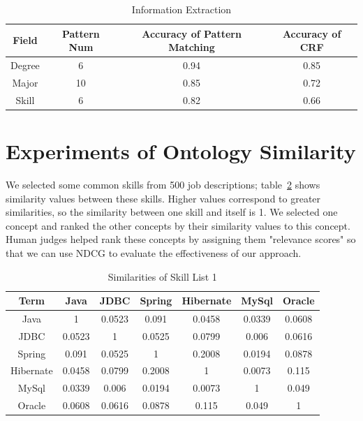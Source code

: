 \begin{table}[ht]
\caption{Information Extraction} %
\centering %
\begin{tabular}{   | c | c | c | c |   }
 \hline
          Field   & Pattern Num & Accuracy of Pattern Matching  & Accuracy of CRF   \\
 \hline
          Degree  & 6           & 0.94       &  0.85  \\
 \hline
          Major   & 10          & 0.85       &  0.72  \\
 \hline
          Skill   & 6           & 0.82       &  0.66  \\
 \hline
\end{tabular}
\label{tab:ieaccura} %
\end{table}

\section{Experiments of Ontology Similarity}

We selected some common skills from 500 job descriptions; table~\ref{tab:dismatrix3} shows similarity values between these skills. Higher values correspond to greater similarities, so the similarity between one skill and itself is 1. We selected one concept and ranked the other concepts by their similarity values to this concept. Human judges helped rank these concepts by assigning them "relevance scores" so that we can use NDCG to evaluate the effectiveness of our approach.

\begin{table}

\caption{Similarities of Skill List 1}
\begin{tabular}{ c | c c c c c c   }
 \hline
  Term       &  Java  &  JDBC  & Spring & Hibernate & MySql  & Oracle   \\  \hline
  Java   &   1    & 0.0523 & 0.091  &   0.0458  & 0.0339 & 0.0608    \\  \hline
    JDBC   & 0.0523 &   1    & 0.0525 &   0.0799  & 0.006  & 0.0616   \\  \hline
   Spring  & 0.091  & 0.0525 &   1    &   0.2008  & 0.0194 & 0.0878   \\  \hline
 Hibernate & 0.0458 & 0.0799 & 0.2008 &     1     & 0.0073 & 0.115    \\  \hline
   MySql   & 0.0339 & 0.006  & 0.0194 &   0.0073  &   1    & 0.049    \\  \hline
   Oracle  & 0.0608 & 0.0616 & 0.0878 &   0.115   & 0.049  &   1      \\  \hline
 \hline
\end{tabular}
\label{tab:dismatrix3}
\end{table}

